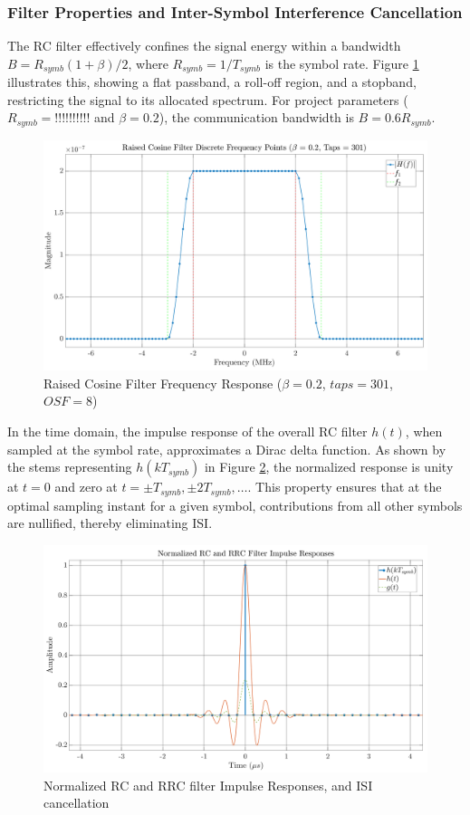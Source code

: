 \subsubsection{Filter Properties and Inter-Symbol Interference Cancellation}
The RC filter effectively confines the signal energy within a bandwidth $B = R_{symb} (1+\beta)/2$, where $R_{symb} = 1/T_{symb}$ is the symbol rate. Figure \ref{fig:h-rc-freq} illustrates this, showing a flat passband, a roll-off region, and a stopband, restricting the signal to its allocated spectrum. For project parameters ($R_{symb} = !!!!!!!!!!$ and $\beta = 0.2$), the communication bandwidth is $B = 0.6 R_{symb}$.

\begin{figure}[H]
	\centering
	\includegraphics[width=0.9\linewidth]{Images/h-rc-freq} %
	\caption{Raised Cosine Filter Frequency Response ($\beta = 0.2$, $taps = 301$, $OSF = 8$)}
	\label{fig:h-rc-freq}
\end{figure}

In the time domain, the impulse response of the overall RC filter $h(t)$, when sampled at the symbol rate, approximates a Dirac delta function. As shown by the stems representing $h(kT_{symb})$ in Figure \ref{fig:h-rc}, the normalized response is unity at $t=0$ and zero at $t = \pm T_{symb}, \pm 2T_{symb}, \dots$. This property ensures that at the optimal sampling instant for a given symbol, contributions from all other symbols are nullified, thereby eliminating ISI.

\begin{figure}[H]
	\centering
	\includegraphics[width=0.9\linewidth]{Images/h-rc} %
	\caption{Normalized RC and RRC filter Impulse Responses, and ISI cancellation}
	\label{fig:h-rc}
\end{figure}

